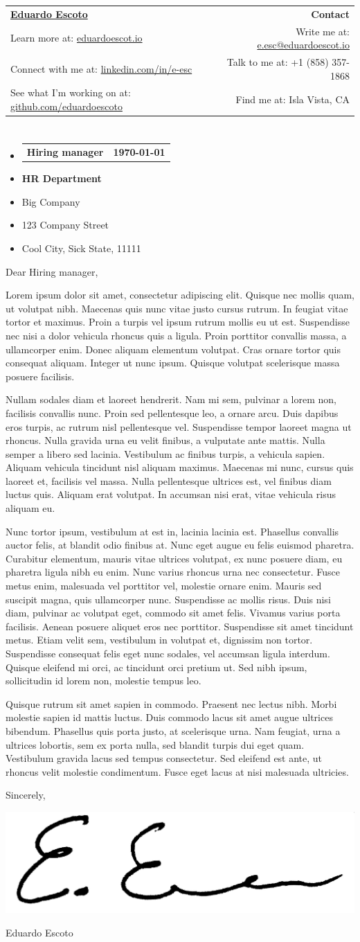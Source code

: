 \documentclass[letterpaper,11pt]{article}
\makeatletter
\newcommand{\Header}{
  \begin{tabular*}{\textwidth}{l@{\extracolsep{\fill}}r}
  \textbf{\href{http://\PersonalWebsite}{\Huge{\Name}}} & \textbf{\LARGE Contact}\\
  Learn more at: \href{http://\PersonalWebsite}{\PersonalWebsite} & Write me at: \href{mailto:\PersonalEmail}{\PersonalEmail}\\
  Connect with me at: \href{https://\LinkedIn}{\LinkedIn} & Talk to me at: \PhoneNumber \\
  See what I'm working on at: \href{https://\Github}{\Github} & Find me at: \Location
  \end{tabular*}\vspace{-5pt}
  \section{}
}
\newcommand{\EmployerInformation}{
  \begin{itemize}[leftmargin=0pt]
    \item[]{
      \begin{tabular*}{\textwidth}[t]{l@{\extracolsep{\fill}}r}
      \large{{\textbf{\EmployerName}}} & \large{{\textbf{\Date}}}
    \end{tabular*}\vspace{-6pt}
    }
    \item[]{\large{\textbf{\Department}}}\vspace{-6pt}
    \item[]{\large{\CompanyName}}\vspace{-6pt}
    \item[]{\large{\CompanyAddress}}\vspace{-6pt}
    \item[]{\large{\CompanyCSZP}}\vspace{-6pt} 
  \end{itemize}
}
\newcommand{\Salutation}{
  \vspace{30pt}
  Dear \EmployerName{}, \par \bigskip
}
\newcommand{\CoverLetterParagraph}[1]{
  \par
  #1
  \bigskip
  }
\newcommand{\Closing}{
  \vspace{30pt}
  \par Sincerely, \bigskip
  \par \Signature \medskip
  \par \Name
  }
\newcommand{\Name}{Eduardo Escoto}
\newcommand{\PersonalWebsite}{eduardoescot.io}
\newcommand{\LinkedIn}{linkedin.com/in/e-esc}
\newcommand{\Github}{github.com/eduardoescoto}
\newcommand{\PersonalEmail}{e.esc@eduardoescot.io}
\newcommand{\PhoneNumber}{+1 (858) 357-1868}
\newcommand{\Location}{Isla Vista, CA}
\newcommand{\Signature}{\includegraphics[height=2.2\baselineskip]{../assets/signature}}
\newcommand{\CompanyName}{Big Company}
\newcommand{\Department}{HR Department}
\newcommand{\EmployerName}{Hiring manager}
\newcommand{\CompanyAddress}{123 Company Street}
\newcommand{\CompanyCSZP}{Cool City, Sick State, 11111}
\newcommand{\Date}[1][\today]{#1}
\makeatother
\begin{document}
\Header
\EmployerInformation

\Salutation

\CoverLetterParagraph{  
Lorem ipsum dolor sit amet, consectetur adipiscing elit. Quisque nec mollis quam, ut volutpat nibh. Maecenas quis nunc vitae justo cursus rutrum. In feugiat vitae tortor et maximus. Proin a turpis vel ipsum rutrum mollis eu ut est. Suspendisse nec nisi a dolor vehicula rhoncus quis a ligula. Proin porttitor convallis massa, a ullamcorper enim. Donec aliquam elementum volutpat. Cras ornare tortor quis consequat aliquam. Integer ut nunc ipsum. Quisque volutpat scelerisque massa posuere facilisis.
}
 
\CoverLetterParagraph{
Nullam sodales diam et laoreet hendrerit. Nam mi sem, pulvinar a lorem non, facilisis convallis nunc. Proin sed pellentesque leo, a ornare arcu. Duis dapibus eros turpis, ac rutrum nisl pellentesque vel. Suspendisse tempor laoreet magna ut rhoncus. Nulla gravida urna eu velit finibus, a vulputate ante mattis. Nulla semper a libero sed lacinia. Vestibulum ac finibus turpis, a vehicula sapien. Aliquam vehicula tincidunt nisl aliquam maximus. Maecenas mi nunc, cursus quis laoreet et, facilisis vel massa. Nulla pellentesque ultrices est, vel finibus diam luctus quis. Aliquam erat volutpat. In accumsan nisi erat, vitae vehicula risus aliquam eu.
}

\CoverLetterParagraph{
Nunc tortor ipsum, vestibulum at est in, lacinia lacinia est. Phasellus convallis auctor felis, at blandit odio finibus at. Nunc eget augue eu felis euismod pharetra. Curabitur elementum, mauris vitae ultrices volutpat, ex nunc posuere diam, eu pharetra ligula nibh eu enim. Nunc varius rhoncus urna nec consectetur. Fusce metus enim, malesuada vel porttitor vel, molestie ornare enim. Mauris sed suscipit magna, quis ullamcorper nunc. Suspendisse ac mollis risus. Duis nisi diam, pulvinar ac volutpat eget, commodo sit amet felis. Vivamus varius porta facilisis. Aenean posuere aliquet eros nec porttitor. Suspendisse sit amet tincidunt metus. Etiam velit sem, vestibulum in volutpat et, dignissim non tortor. Suspendisse consequat felis eget nunc sodales, vel accumsan ligula interdum. Quisque eleifend mi orci, ac tincidunt orci pretium ut. Sed nibh ipsum, sollicitudin id lorem non, molestie tempus leo.
}

\CoverLetterParagraph{
Quisque rutrum sit amet sapien in commodo. Praesent nec lectus nibh. Morbi molestie sapien id mattis luctus. Duis commodo lacus sit amet augue ultrices bibendum. Phasellus quis porta justo, at scelerisque urna. Nam feugiat, urna a ultrices lobortis, sem ex porta nulla, sed blandit turpis dui eget quam. Vestibulum gravida lacus sed tempus consectetur. Sed eleifend est ante, ut rhoncus velit molestie condimentum. Fusce eget lacus at nisi malesuada ultricies.
}

\Closing
\end{document}
